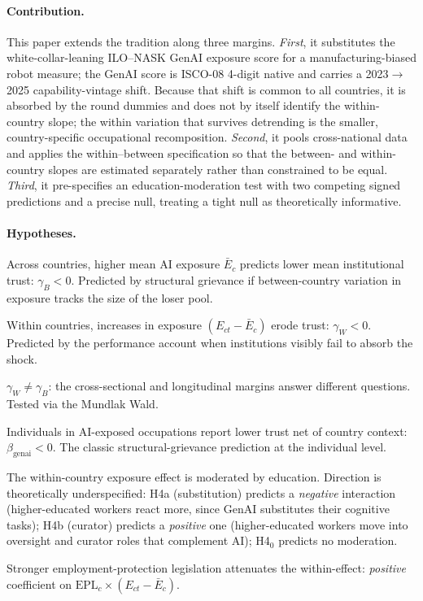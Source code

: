 \paragraph{Contribution.}
This paper extends the tradition along three margins. \emph{First}, it
substitutes the white-collar-leaning ILO--NASK GenAI exposure score
\citep{Gmyrek2025} for a manufacturing-biased robot measure; the GenAI
score is ISCO-08 4-digit native and carries a 2023$\to$2025
capability-vintage shift. Because that shift is common to all countries,
it is absorbed by the round dummies and does not by itself identify the
within-country slope; the within variation that survives detrending is
the smaller, country-specific occupational recomposition.
\emph{Second}, it pools cross-national data and applies the within--between
specification \citep{BellJones2015,SchmidtCatranFairbrother2016} so that
the between- and within-country slopes are estimated separately rather
than constrained to be equal. \emph{Third}, it pre-specifies an
education-moderation test with two competing signed predictions and a
precise null, treating a tight null as theoretically informative.

\paragraph{Hypotheses.}
\begin{description}
\setlength\itemsep{2pt}
  \item[H1 (between).] Across countries, higher mean AI exposure
    $\bar E_c$ predicts lower mean institutional trust:
    $\gamma_B < 0$. Predicted by structural grievance if between-country
    variation in exposure tracks the size of the loser pool.
  \item[H2 (within).] Within countries, increases in exposure
    $(E_{ct}-\bar E_c)$ erode trust: $\gamma_W < 0$. Predicted by the
    performance account when institutions visibly fail to absorb the
    shock.
  \item[H2a (decomposition).] $\gamma_W \neq \gamma_B$: the
    cross-sectional and longitudinal margins answer different questions.
    Tested via the Mundlak Wald.
  \item[H3 (compositional).] Individuals in AI-exposed occupations
    report lower trust net of country context:
    $\beta_{\mathrm{genai}} < 0$. The classic structural-grievance
    prediction at the individual level.
  \item[H4.] The within-country exposure effect is moderated by
    education. Direction is theoretically underspecified:
    H4a (substitution) predicts a \emph{negative} interaction
    (higher-educated workers react more, since GenAI substitutes their
    cognitive tasks); H4b (curator) predicts a \emph{positive} one
    (higher-educated workers move into oversight and curator roles
    that complement AI); H4$_0$ predicts no moderation.
  \item[H5 (institutional moderation).] Stronger employment-protection
    legislation attenuates the within-effect:
    \emph{positive} coefficient on $\mathrm{EPL}_c \times (E_{ct}-\bar E_c)$.
\end{description}

